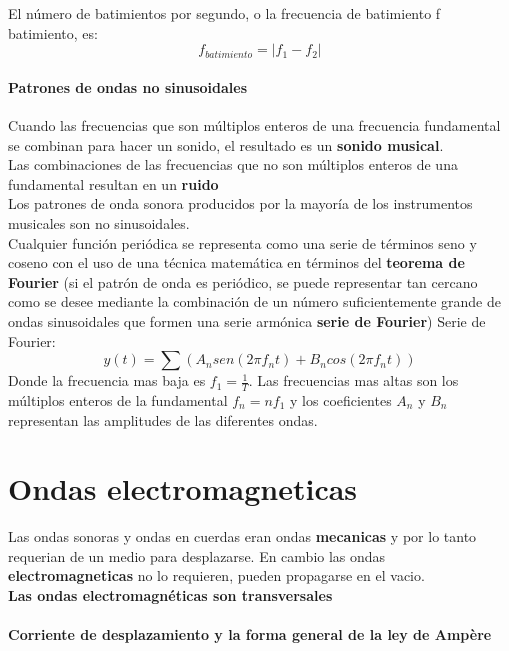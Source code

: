 \documentclass[10pt]{article}
\begin{document}
El número de batimientos por segundo, o la
frecuencia de batimiento f batimiento, es:
\begin{equation*}
	f_{batimiento} = |f_1-f_2|
\end{equation*}

\paragraph{Patrones de ondas no sinusoidales}
Cuando las frecuencias que son múltiplos enteros de una frecuencia fundamental se
combinan para hacer un sonido, el resultado es un \textbf{sonido musical}.\\
\linebreak
 Las combinaciones de las frecuencias que no son múltiplos enteros
de una fundamental resultan en un \textbf{ruido}\\
\linebreak
Los patrones de onda sonora producidos por la mayoría de los instrumentos musicales
son no sinusoidales.\\
\linebreak
Cualquier función periódica se representa como una serie de términos seno y coseno 
con el uso de una técnica matemática en términos del \textbf{teorema de Fourier} (si el patrón de onda es periódico, se puede representar tan cercano como se desee mediante la combinación de un número suficientemente grande de ondas sinusoidales que formen una serie armónica \textbf{serie de Fourier})
Serie de Fourier:
\begin{equation*}
y(t) = \sum (A_n sen(2\pi f_n t) + B_n cos(2\pi f_n t))
\end{equation*}
Donde la frecuencia mas baja es $f_1 = \frac{1}{T}$. Las frecuencias mas altas son los múltiplos enteros de la fundamental 
$f_n = nf_1$ y los coeficientes $A_n$ y $B_n$ representan las amplitudes de las diferentes ondas.

\section{Ondas electromagneticas}
Las ondas sonoras y ondas en cuerdas eran ondas \textbf{mecanicas} y por lo tanto requerian de un medio para desplazarse. En cambio las ondas \textbf{electromagneticas} no lo requieren, pueden propagarse en el vacio.\\
\linebreak
\textbf{Las ondas electromagnéticas son transversales}

\paragraph{Corriente de desplazamiento
y la forma general de la ley de Ampère}
\end{document}

